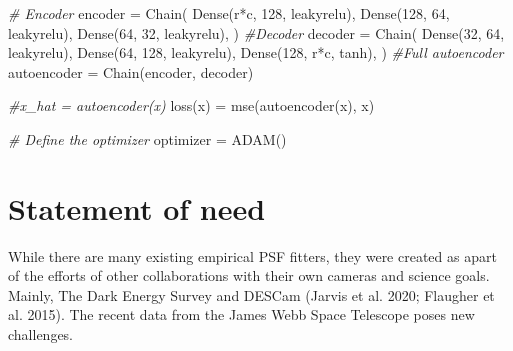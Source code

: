 \documentclass[10pt,a4paper,onecolumn]{article}
\newenvironment{Shaded}{}{}
\newcommand{\CommentTok}[1]{\textcolor[rgb]{0.38,0.63,0.69}{\textit{#1}}}
\newcommand{\FloatTok}[1]{\textcolor[rgb]{0.25,0.63,0.44}{#1}}
\newcommand{\NormalTok}[1]{#1}
\newcommand{\OperatorTok}[1]{\textcolor[rgb]{0.40,0.40,0.40}{#1}}
\begin{document}
\begin{Shaded}
\begin{Highlighting}[]
\CommentTok{\# Encoder    }
\NormalTok{encoder }\OperatorTok{=}\NormalTok{ Chain(    }
\NormalTok{                Dense(r}\OperatorTok{*}\NormalTok{c}\OperatorTok{,} \FloatTok{128}\OperatorTok{,}\NormalTok{ leakyrelu)}\OperatorTok{,}    
\NormalTok{                Dense(}\FloatTok{128}\OperatorTok{,} \FloatTok{64}\OperatorTok{,}\NormalTok{ leakyrelu)}\OperatorTok{,}    
\NormalTok{                Dense(}\FloatTok{64}\OperatorTok{,} \FloatTok{32}\OperatorTok{,}\NormalTok{ leakyrelu)}\OperatorTok{,}    
\NormalTok{               )    }
\CommentTok{\#Decoder}
\NormalTok{decoder }\OperatorTok{=}\NormalTok{ Chain(    }
\NormalTok{                Dense(}\FloatTok{32}\OperatorTok{,} \FloatTok{64}\OperatorTok{,}\NormalTok{ leakyrelu)}\OperatorTok{,}    
\NormalTok{                Dense(}\FloatTok{64}\OperatorTok{,} \FloatTok{128}\OperatorTok{,}\NormalTok{ leakyrelu)}\OperatorTok{,}    
\NormalTok{                Dense(}\FloatTok{128}\OperatorTok{,}\NormalTok{ r}\OperatorTok{*}\NormalTok{c}\OperatorTok{,}\NormalTok{ tanh)}\OperatorTok{,}    
\NormalTok{               )    }
\CommentTok{\#Full autoencoder}
\NormalTok{autoencoder }\OperatorTok{=}\NormalTok{ Chain(encoder}\OperatorTok{,}\NormalTok{ decoder)    }
                      
\CommentTok{\#x\_hat = autoencoder(x)    }
\NormalTok{loss(x) }\OperatorTok{=}\NormalTok{ mse(autoencoder(x)}\OperatorTok{,}\NormalTok{ x)    }
    
\CommentTok{\# Define the optimizer    }
\NormalTok{optimizer }\OperatorTok{=}\NormalTok{ ADAM()    }
\end{Highlighting}
\end{Shaded}

\hypertarget{statement-of-need}{%
\section{Statement of need}\label{statement-of-need}}

While there are many existing empirical PSF fitters, they were created
as apart of the efforts of other collaborations with their own cameras
and science goals. Mainly, The Dark Energy Survey and DESCam (Jarvis et
al. 2020; Flaugher et al. 2015). The recent data from the James Webb
Space Telescope poses new challenges.
\end{document}
